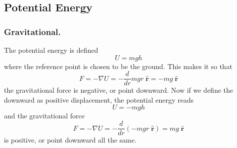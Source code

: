 \documentclass[../../../main.tex]{subfiles}
\begin{document}
\subsection*{Potential Energy}
\subsubsection*{Gravitational.} 
The potential energy is defined 
\begin{equation*}
    U=mgh
\end{equation*}
where the reference point is chosen to be the ground.
This makes it so that 
\begin{equation*}
    F=-\nabla U=-\frac{d}{dr}mgr\;\mathbf{\hat{r}}=-mg\;\mathbf{\hat{r}}
\end{equation*}
the gravitational force is negative, or point downward.
Now if we define the downward as positive displacement, the potential energy reads
\begin{equation*}
    U=-mgh
\end{equation*}
and the gravitational force
\begin{equation*}
    F=-\nabla U=-\frac{d}{dr}\left(-mgr\;\mathbf{\hat{r}}\right)=mg\;\mathbf{\hat{r}} 
\end{equation*}
is positive, or point downward all the same.
\end{document}
